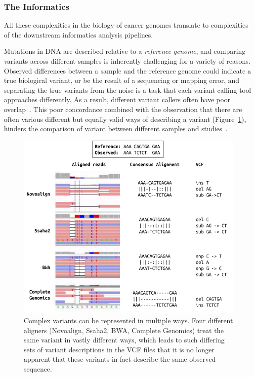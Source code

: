 \begin{justify}
\subsubsection{The Informatics}

All these complexities in the biology of cancer genomes translate to complexities of the downstream informatics analysis pipelines.

Mutations in DNA are described relative to a \emph{reference genome}, and comparing variants across different samples is inherently challenging for a variety of reasons. Observed differences between a sample and the reference genome could indicate a true biological variant, or be the result of a sequencing or mapping error, and separating the true variants from the noise is a task that each variant calling tool approaches differently. As a result, different variant callers often have poor overlap~\cite{orawe2013, hwang2015systematic}. This poor concordance combined with the observation that there are often various different but equally valid ways of describing a variant (Figure~\ref{fig:variant-multiple-representations}), hinders the comparison of variant between different samples and studies~\cite{zook2014integrating}.

\begin{figure}[h!]
    \centering
    \includegraphics[width=400pt]{chapters/images/variant-representation-all.png}

    \caption{Complex variants can be represented in multiple ways. Four different aligners (Novoalign, Ssaha2, BWA, Complete Genomics) treat the same variant in vastly different ways, which leads to such differing sets of variant descriptions in the VCF files that it is no longer apparent that these variants in fact describe the same observed sequence.}
    \label{fig:variant-multiple-representations}
\end{figure}



\end{justify}

